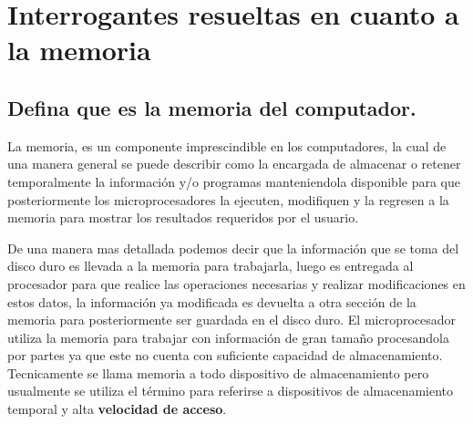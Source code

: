 \documentclass{article}
\begin{document}
\section{Interrogantes resueltas en cuanto a la memoria} \label{contenido}

\subsection{\textbf{Defina que es la memoria del computador.}}
La memoria, es un componente imprescindible en los computadores, la cual de una manera general se puede describir como la encargada de almacenar o retener temporalmente la información y/o programas manteniendola disponible para que posteriormente los microprocesadores la ejecuten, modifiquen y la regresen a la memoria para mostrar los resultados requeridos por el usuario. \cite{augusto} \cite{ecured}

De una manera mas detallada podemos decir que la información que se toma del disco duro es llevada a la memoria para trabajarla, luego es entregada al procesador para que realice las operaciones necesarias y realizar modificaciones en estos datos, la información ya modificada es devuelta a otra sección de la memoria para posteriormente ser guardada en el disco duro.
El microprocesador utiliza la memoria para trabajar con información de gran tamaño procesandola por partes ya que este no cuenta con suficiente capacidad de almacenamiento.
Tecnicamente se llama memoria a todo dispositivo de almacenamiento pero usualmente se utiliza el término para referirse a dispositivos de almacenamiento temporal y alta \textbf{velocidad de acceso}. \cite{augusto}
    
\end{document}
